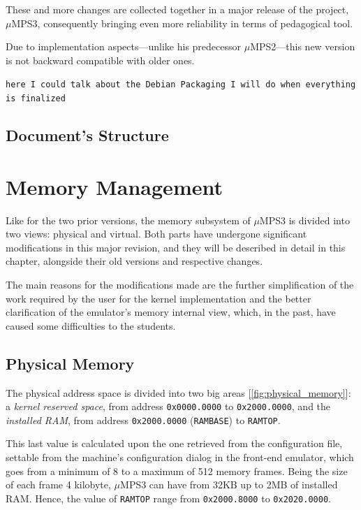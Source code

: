 \documentclass[12pt,a4paper,openright,twoside]{report}
\begin{document}
These and more changes are collected together in a major release of the project, $\mu$MPS3, consequently bringing even more reliability in terms of pedagogical tool.

Due to implementation aspects---unlike his predecessor $\mu$MPS2---this new version is not backward compatible with older ones.

\texttt{here I could talk about the Debian Packaging I will do when everything is finalized}

\section{Document's Structure}

\chapter{Memory Management}
\lhead[\fancyplain{}{\bfseries\thepage}]{\fancyplain{}{\bfseries\rightmark}}
Like for the two prior versions, the memory subsystem of $\mu$MPS3 is divided into two views: physical and virtual.
Both parts have undergone significant modifications in this major revision, and they will be described in detail in this chapter, alongside their old versions and respective changes.

The main reasons for the modifications made are the further simplification of the work required by the user for the kernel implementation and the better clarification of the emulator's memory internal view, which, in the past, have caused some difficulties to the students.

\section{Physical Memory}
The physical address space is divided into two big areas [\autoref{fig:physical_memory}]: a \textit{kernel reserved space}, from address \texttt{0x0000.0000} to \texttt{0x2000.0000}, and the \textit{installed RAM}, from address \texttt{0x2000.0000} (\texttt{RAMBASE}) to \texttt{RAMTOP}.

This last value is calculated upon the one retrieved from the configuration file, settable from the machine's configuration dialog in the front-end emulator, which goes from a minimum of 8 to a maximum of 512 memory frames.
Being the size of each frame 4 kilobyte, $\mu$MPS3 can have from 32KB up to 2MB of installed RAM.
Hence, the value of \texttt{RAMTOP} range from \texttt{0x2000.8000} to \texttt{0x2020.0000}.
\end{document}

